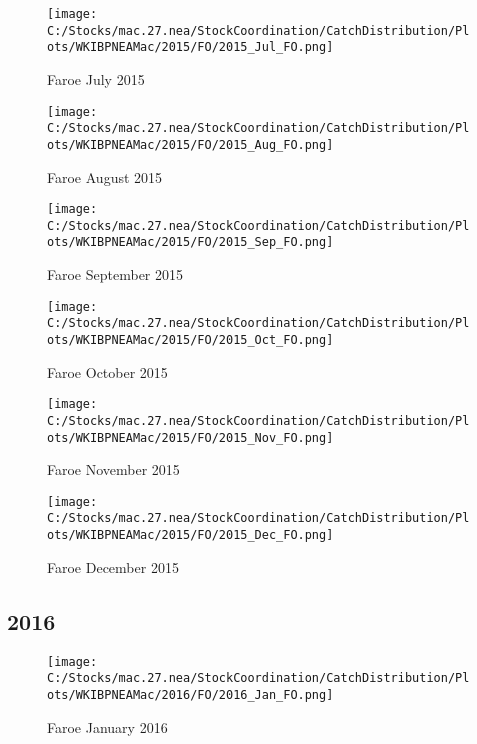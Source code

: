 \documentclass{article}
\begin{document}
\begin{figure}
	\centering
		\texttt{[image: C:/Stocks/mac.27.nea/StockCoordination/CatchDistribution/Plots/WKIBPNEAMac/2015/FO/2015\_Jul\_FO.png]}
	\caption{Faroe July 2015}
	\label{fig:2015_Jul_FO}
\end{figure}

\begin{figure}
	\centering
		\texttt{[image: C:/Stocks/mac.27.nea/StockCoordination/CatchDistribution/Plots/WKIBPNEAMac/2015/FO/2015\_Aug\_FO.png]}
	\caption{Faroe August 2015}
	\label{fig:2015_Aug_FO}
\end{figure}

\begin{figure}
	\centering
		\texttt{[image: C:/Stocks/mac.27.nea/StockCoordination/CatchDistribution/Plots/WKIBPNEAMac/2015/FO/2015\_Sep\_FO.png]}
	\caption{Faroe September 2015}
	\label{fig:2015_Sep_FO}
\end{figure}

\begin{figure}
	\centering
		\texttt{[image: C:/Stocks/mac.27.nea/StockCoordination/CatchDistribution/Plots/WKIBPNEAMac/2015/FO/2015\_Oct\_FO.png]}
	\caption{Faroe October 2015}
	\label{fig:2015_Oct_FO}
\end{figure}

\begin{figure}
	\centering
		\texttt{[image: C:/Stocks/mac.27.nea/StockCoordination/CatchDistribution/Plots/WKIBPNEAMac/2015/FO/2015\_Nov\_FO.png]}
	\caption{Faroe November 2015}
	\label{fig:2015_Nov_FO}
\end{figure}

\begin{figure}
	\centering
		\texttt{[image: C:/Stocks/mac.27.nea/StockCoordination/CatchDistribution/Plots/WKIBPNEAMac/2015/FO/2015\_Dec\_FO.png]}
	\caption{Faroe December 2015}
	\label{fig:2015_Dec_FO}
\end{figure}

\clearpage

\newpage

\subsection{2016}



\begin{figure}[h]
	\centering
		\texttt{[image: C:/Stocks/mac.27.nea/StockCoordination/CatchDistribution/Plots/WKIBPNEAMac/2016/FO/2016\_Jan\_FO.png]}
	\caption{Faroe January 2016}
	\label{fig:2016_Jan_FO}
\end{figure}
\end{document}
